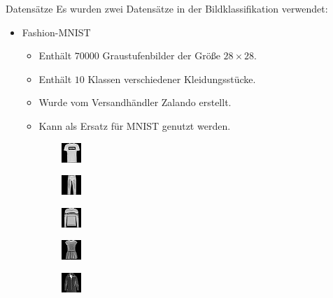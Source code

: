 \documentclass[aspectratio=169, 12pt]{beamer}
\begin{document}
\begin{frame}{Datensätze}
  Es wurden zwei Datensätze in der Bildklassifikation verwendet:
  \begin{itemize}
    \item Fashion-MNIST
    \begin{itemize}
      \item Enthält $70000$ Graustufenbilder der Größe $28 \times 28$.
      \item Enthält $10$ Klassen verschiedener Kleidungsstücke.
      \item Wurde vom Versandhändler Zalando erstellt.
      \item Kann als Ersatz für MNIST genutzt werden.
    \end{itemize}
  \end{itemize}
  \begin{figure}
    \begin{subfigure}{1.4cm}
        \centering
        \includegraphics{images/datasets/fashionmnist/fashion_mnist_0_0.png}
    \end{subfigure}
    \begin{subfigure}{1.4cm}
        \centering
        \includegraphics{images/datasets/fashionmnist/fashion_mnist_1_0.png}
    \end{subfigure}
    \begin{subfigure}{1.4cm}
        \centering
        \includegraphics{images/datasets/fashionmnist/fashion_mnist_2_0.png}
    \end{subfigure}
    \begin{subfigure}{1.4cm}
        \centering
        \includegraphics{images/datasets/fashionmnist/fashion_mnist_3_0.png}
    \end{subfigure}
    \begin{subfigure}{1.4cm}
        \centering
        \includegraphics{images/datasets/fashionmnist/fashion_mnist_4_0.png}

\end{subfigure}
\end{figure}
\end{frame}
\end{document}
